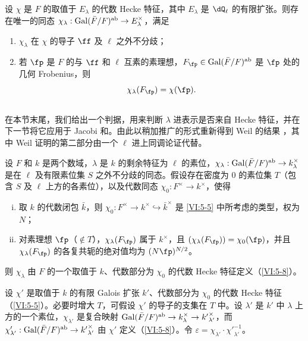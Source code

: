 \begin{theorem_}[{\cite{se68}}]\label{VI:5-8}
设 $\chi$ 是 $F$ 的取值于 $E_\lambda$ 的代数 Hecke 特征，其中 $E_\lambda$ 是 $\dQ_\ell$ 的有限扩张。则存在唯一的同态 $\chi_\lambda:\operatorname{Gal}(\bar F/F)^\textnormal{ab} \to E_\lambda^\times$，满足
\begin{enumerate}[\indent (i)]
  \item $\chi_\lambda$ 在 $\chi$ 的导子 $\ff$ 及 $\ell$ 之外不分歧；
  \item 若 $\fp$ 是 $F$ 的与 $\ff$ 和 $\ell$ 互素的素理想，$F_\fp\in \gal(\bar F/F)^\textnormal{ab}$ 是 $\fp$ 处的几何 Frobenius，则
    \[
      \chi_\lambda(F_\fp) = \chi(\fp) \text{.}
    \]
\end{enumerate}
\end{theorem_}

\subsection{}\label{VI:5-9}

在本节末尾，我们给出一个判据，用来判断 $\lambda$ 进表示是否来自 Hecke 特征，并在下一节将它应用于 Jacobi 和。由此以稍加推广的形式重新得到 Weil 的结果 \cite{we52,we74-2}，其中 Weil 证明的第二部分由一个 $\ell$ 进上同调论证代替。

\begin{theorem_}\label{VI:5-10}
设 $F$ 和 $k$ 是两个数域，$\lambda$ 是 $k$ 的剩余特征为 $\ell$ 的素位，$\chi_\lambda:\operatorname{Gal}(\bar F/F)^\textnormal{ab}\to k_\lambda^\times$ 是在 $\ell$ 及有限素位集 $S$ 之外不分歧的同态。假设存在密度为 $0$ 的素位集 $T$（包含 $S$ 及 $\ell$ 上方的各素位），以及代数同态 $\chi_0:F^\times \to k^\times$，使得
\begin{enumerate}[(i)]
  \item 取 $k$ 的代数闭包 $\bar k$，则 $\chi_0:F^\times \to k^\times \hookrightarrow \bar k^\times$ 是 \ref{VI:5-5} 中所考虑的类型，权为 $N$；
  \item 对素理想 $\fp$（$\notin T$），$\chi_\lambda(F_\fp)$ 属于 $k^\times$，且 $(\chi_\lambda(F_\fp))=\chi_0(\fp)$，并且 $\chi_\lambda(F_\fp)$ 的各复共轭的绝对值均为 $(N \fp)^{N/2}$。
\end{enumerate}

则 $\chi_\lambda$ 由 $F$ 的一个取值于 $k$、代数部分为 $\chi_0$ 的代数 Hecke 特征定义（\ref{VI:5-8}）。
\end{theorem_}

设 $\chi'$ 是取值于 $k$ 的有限 Galois 扩张 $k'$、代数部分为 $\chi_0$ 的代数 Hecke 特征（\ref{VI:5-5}）。必要时增大 $T$，可假设 $\chi'$ 的导子的支集在 $T$ 中。设 $\lambda'$ 是 $k'$ 中 $\lambda$ 上方的一个素位，$\chi_{\lambda'}$ 是复合映射 $\operatorname{Gal}(\bar F/F)^\text{ab}\to k_\lambda^\times \to {k'}_{\lambda'}^\times$，而 $\chi_{\lambda'}':\operatorname{Gal}(\bar F/F)^\text{ab}\to {k'}_{\lambda'}^\times$ 由 $\chi'$ 定义（\ref{VI:5-8}）。令 $\varepsilon = \chi_{\lambda'} \cdot {\chi'}_{\lambda'}^{-1}$。

